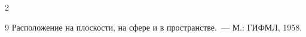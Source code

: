 \begin{multicols}{2}
{{\begin{thebibliography}{9}
Расположение на плоскости, на сфере и в пространстве.~--- М.: ГИФМЛ, 1958.


































 \end{thebibliography}


}


}








\end{multicols}


